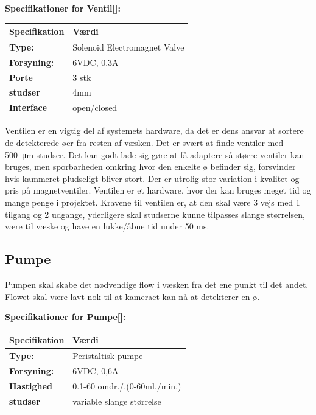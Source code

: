 \textbf{Specifikationer for Ventil[\citet{DH5}]:} 
\begin{center}
		\begin{longtable}{ | m{6.5cm} | m{6.5cm}| } 
			\hline
			\textbf{Specifikation} &\textbf{Værdi} \\ 
			\hline
			\textbf{Type:} & Solenoid Electromagnet Valve \\ 
			\hline
			\textbf{Forsyning:} & 6VDC, 0.3A  \\ 
			\hline
			\textbf{Porte} & 3 stk \\ 
			\hline		
			\textbf{studser} & 4mm  \\ 
			\hline	
			\textbf{Interface} & open/closed  \\ 
			\hline	
		\end{longtable}
\end{center} 
Ventilen er en vigtig del af systemets hardware, da det er dens ansvar at sortere de detekterede øer fra resten af væsken. Det er svært at finde ventiler med \SI{500}{\micro\metre} studser. Det kan godt lade sig gøre at få adaptere så større ventiler kan bruges, men sporbarheden omkring hvor den enkelte ø befinder sig, forsvinder hvis kammeret pludseligt bliver stort. Der er utrolig stor variation i kvalitet og pris på magnetventiler. Ventilen er et hardware, hvor der kan bruges meget tid og mange penge i projektet.
Kravene til ventilen er, at den skal være 3 vejs med 1 tilgang og 2 udgange, yderligere skal studserne kunne tilpasses slange størrelsen, være til væske og have en lukke/åbne tid under 50 ms.

\newpage
\subsection{Pumpe}
Pumpen skal skabe det nødvendige flow i væsken fra det ene punkt til det andet. Flowet skal være lavt nok til at kameraet kan nå at detekterer en ø.

\textbf{Specifikationer for Pumpe[\citet{DH8}]:} 
\begin{center}
		\begin{longtable}{ | m{6.5cm} | m{6.5cm}| } 
			\hline
			\textbf{Specifikation} &\textbf{Værdi} \\ 
			\hline
			\textbf{Type:} & Peristaltisk pumpe \\ 
			\hline
			\textbf{Forsyning:} & 6VDC, 0,6A  \\ 
			\hline
			\textbf{Hastighed} & 0.1-60 omdr./.(0-60ml./min.) \\ 
			\hline		
			\textbf{studser} & variable slange størrelse  \\ 
			\hline	
		\end{longtable}
\end{center}

